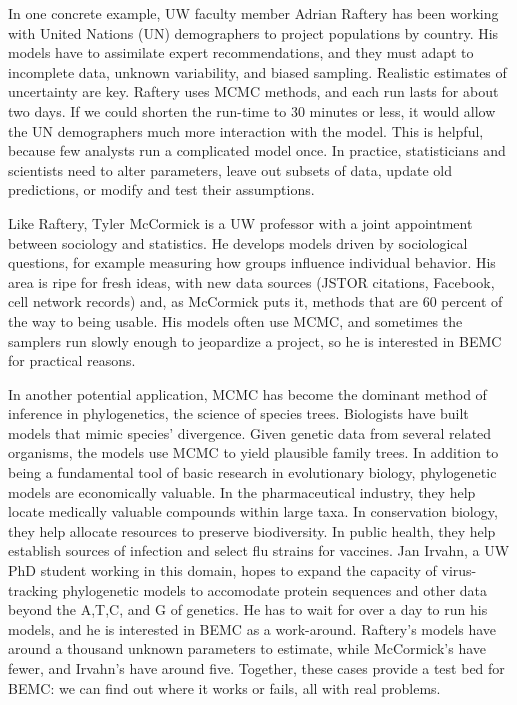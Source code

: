 \documentclass[11pt,letterpaper]{article}
\begin{document}
In one concrete example, UW faculty member Adrian Raftery has been working with United Nations (UN) demographers to project populations by country. His models have to assimilate expert recommendations, and they must adapt to incomplete data, unknown variability, and biased sampling. Realistic estimates of uncertainty are key. Raftery uses MCMC methods, and each run lasts for about two days. If we could shorten the run-time to 30 minutes or less, it would allow the UN demographers much more interaction with the model. This is helpful, because few analysts run a complicated model once. In practice, statisticians and scientists need to alter parameters, leave out subsets of data, update old predictions, or modify and test their assumptions.

Like Raftery, Tyler McCormick is a UW professor with a joint appointment between sociology and statistics. He develops models driven by sociological questions, for example measuring how groups influence individual behavior. His area is ripe for fresh ideas, with new data sources (JSTOR citations, Facebook, cell network records) and, as McCormick puts it, methods that are 60 percent of the way to being usable. His models often use MCMC, and sometimes the samplers run slowly enough to jeopardize a project, so he is interested in BEMC for practical reasons.

In another potential application, MCMC has become the dominant method of inference in phylogenetics, the science of species trees. Biologists have built models that mimic species' divergence. Given genetic data from several related organisms, the models use MCMC to yield plausible family trees. In addition to being a fundamental tool of basic research in evolutionary biology, phylogenetic models are economically valuable. In the pharmaceutical industry, they help locate medically valuable compounds within large taxa. In conservation biology, they help allocate resources to preserve biodiversity. In public health, they help establish sources of infection and select flu strains for vaccines. Jan Irvahn, a UW PhD student working in this domain, hopes to expand the capacity of virus-tracking phylogenetic models to accomodate protein sequences and other data beyond the A,T,C, and G of genetics. He has to wait for over a day to run his models, and he is interested in BEMC as a work-around. Raftery's models have around a thousand unknown parameters to estimate, while McCormick's have fewer, and Irvahn's have around five. Together, these cases provide a test bed for BEMC: we can find out where it works or fails, all with real problems. 
\end{document}
